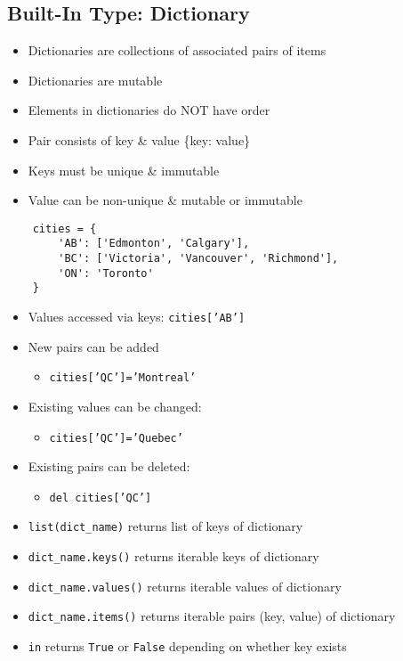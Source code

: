 \documentclass{article}
\begin{document}
\subsection{Built-In Type: Dictionary}
    \begin{multicols}{2}
        \begin{itemize}
            \item Dictionaries are collections of associated pairs of items
            \item Dictionaries are mutable
            \item Elements in dictionaries do NOT have order
            \item Pair consists of key \& value \{key: value\}
            \item Keys must be unique \& immutable
            \item Value can be non-unique \& mutable or immutable
        \end{itemize}
    \end{multicols}
\vspace{-1em}
\begin{lstlisting}
    cities = {
        'AB': ['Edmonton', 'Calgary'],
        'BC': ['Victoria', 'Vancouver', 'Richmond'],
        'ON': 'Toronto'
    }
\end{lstlisting}
\vspace{-1em}
    \begin{multicols}{2}
        \begin{itemize}
            \item Values accessed via keys: \texttt{cities['AB']}
            \item New pairs can be added
                \begin{itemize}
                    \item \texttt{cities['QC']='Montreal'}
                \end{itemize}
            \item Existing values can be changed:
                \begin{itemize}
                    \item \texttt{cities['QC']='Quebec'}
                \end{itemize}
            \item Existing pairs can be deleted:
                \begin{itemize}
                    \item \texttt{del cities['QC']}
                \end{itemize}
            \item \texttt{list(dict\_name)} returns list of keys of dictionary
            \item \texttt{dict\_name.keys()} returns iterable keys of dictionary
            \item \texttt{dict\_name.values()} returns iterable values of dictionary
            \item \texttt{dict\_name.items()} returns iterable pairs (key, value) of dictionary
            \item \texttt{in} returns \texttt{True} or \texttt{False} depending on whether key exists
        \end{itemize}
    \end{multicols}
\end{document}
